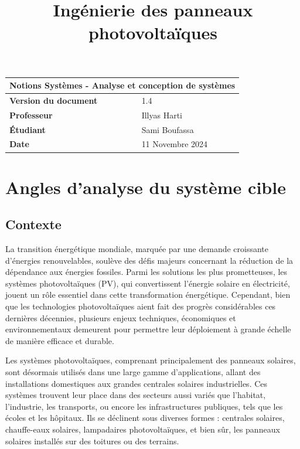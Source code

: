 \documentclass{article}
\title{Ingénierie des panneaux photovoltaïques}
\author{}
\date{\vspace{-5ex}}
\begin{document}
\maketitle

\begin{center}
    \begin{tabular}{|l|l|}
        \hline
        \multicolumn{2}{|c|}{\textbf{Notions Systèmes - Analyse et conception de systèmes}} \\
        \hline
        \textbf{Version du document} & 1.4 \\
        \hline
        \textbf{Professeur} & Illyas Harti\\
        \hline
        \textbf{Étudiant} & Sami Boufassa\\
                            
        \hline
        \textbf{Date} & 11 Novembre 2024 \\
        \hline
    \end{tabular}
\end{center}

\tableofcontents

\newpage

\section{Angles d'analyse du système cible}
\subsection{Contexte}
La transition énergétique mondiale, marquée par une demande croissante d'énergies renouvelables, soulève des défis majeurs concernant la réduction de la dépendance aux énergies fossiles. Parmi les solutions les plus prometteuses, les systèmes photovoltaïques (PV), qui convertissent l'énergie solaire en électricité, jouent un rôle essentiel dans cette transformation énergétique. Cependant, bien que les technologies photovoltaïques aient fait des progrès considérables ces dernières décennies, plusieurs enjeux techniques, économiques et environnementaux demeurent pour permettre leur déploiement à grande échelle de manière efficace et durable.

Les systèmes photovoltaïques, comprenant principalement des panneaux solaires, sont désormais utilisés dans une large gamme d'applications, allant des installations domestiques aux grandes centrales solaires industrielles. Ces systèmes trouvent leur place dans des secteurs aussi variés que l'habitat, l'industrie, les transports, ou encore les infrastructures publiques, tels que les écoles et les hôpitaux. Ils se déclinent sous diverses formes : centrales solaires, chauffe-eaux solaires, lampadaires photovoltaïques, et bien sûr, les panneaux solaires installés sur des toitures ou des terrains.
\end{document}
